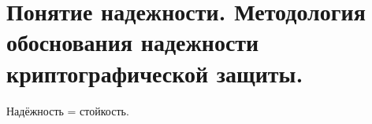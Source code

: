 \section{Понятие надежности. Методология обоснования надежности криптографической защиты.}

Надёжность = стойкость. 
